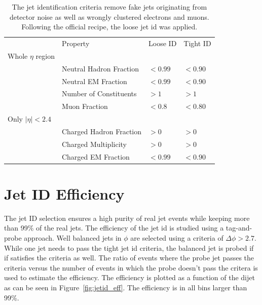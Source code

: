 \begin{table}[htbp]
    \centering
    \caption[Jet Identification Criteria]{The jet identification criteria remove fake jets originating from
    detector noise as well as wrongly clustered electrons and muons. Following
    the official recipe, the loose jet id was applied.}
    \label{tab:jetid}
    \begin{tabular}{llll}
    \toprule
                           & Property                & Loose ID & Tight ID\\\cmidrule(lr){2-4}
    Whole $\eta$ region    &                         &          & \\\cmidrule(lr){1-1}
                           & Neutral Hadron Fraction & $< 0.99$ & $< 0.90$\\
                           & Neutral EM Fraction     & $< 0.99$ & $< 0.90$\\
                           & Number of Constituents  & $> 1$    & $> 1$\\
                           & Muon Fraction           & $< 0.8$  & $< 0.80$\\
    Only $|\eta| < 2.4$    &                         &          & \\\cmidrule(lr){1-1}
                           & Charged Hadron Fraction & $> 0$    & $> 0$\\
                           & Charged Multiplicity    & $> 0$    & $> 0$\\
                           & Charged EM Fraction     & $< 0.99$ & $< 0.90$\\
    \bottomrule
    \end{tabular}
\end{table}


\section{Jet ID Efficiency}

The jet ID selection ensures a high purity of real jet events while keeping more than 99\% of the real jets.
The efficiency of the jet id is studied using a tag-and-probe approach. Well balanced jets in $\phi$ are selected
using a criteria of $\Delta \phi > 2.7$. While one jet needs to pass the tight jet id criteria, the balanced jet is probed
if if satisfies the criteria as well. The ratio of events where the probe jet passes the criteria versus the number of events
in which the probe doesn't pass the critera is used to estimate the efficiency. The efficiency is plotted as a function of the
dijet \ptavg as can be seen in Figure~\ref{fig:jetid_eff}. The efficiency is in all bins larger than 99\%.

